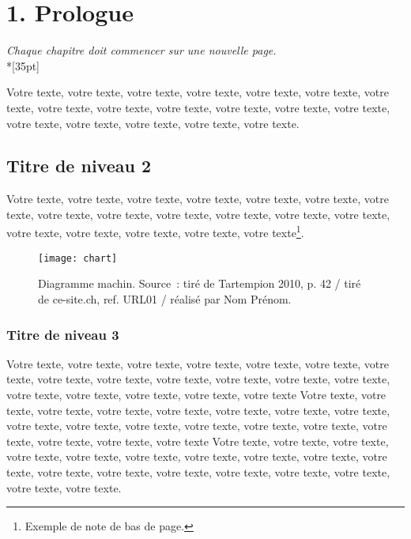 \chapter{1. Prologue}

\begin{center}
	\textit{Chaque chapitre doit commencer sur une nouvelle page.}\\*[35pt]
\end{center}

Votre texte, votre texte, votre texte, votre texte, votre texte, votre texte, votre texte, votre texte, votre texte, votre texte, votre texte, votre texte, votre texte, votre texte, votre texte, votre texte, votre texte, votre texte.


\section{Titre de niveau 2}

Votre texte, votre texte, votre texte, votre texte, votre texte, votre texte, votre texte, votre texte, votre texte, votre texte, votre texte, votre texte, votre texte, votre texte, votre texte, votre texte, votre texte, votre texte\footnote{Exemple de note de bas de page.}.

\begin{figure}[tbph!]
	\centering
	\texttt{[image: chart]}
	\caption[Diagramme machin]{Diagramme machin. Source : tiré de Tartempion 2010, p. 42 / tiré de ce-site.ch, ref. URL01 / réalisé par Nom Prénom.}
	\label{fig:chart1}
\end{figure}


\subsection{Titre de niveau 3}

Votre texte, votre texte, votre texte, votre texte, votre texte, votre texte, votre texte, votre texte, votre texte, votre texte, votre texte, votre texte, votre texte, votre texte, votre texte, votre texte, votre texte, votre texte Votre texte, votre texte, votre texte, votre texte, votre texte, votre texte, votre texte, votre texte, votre texte, votre texte, votre texte, votre texte, votre texte, votre texte, votre texte, votre texte, votre texte, votre texte Votre texte, votre texte, votre texte, votre texte, votre texte, votre texte, votre texte, votre texte, votre texte, votre texte, votre texte, votre texte, votre texte, votre texte, votre texte, votre texte, votre texte, votre texte.

